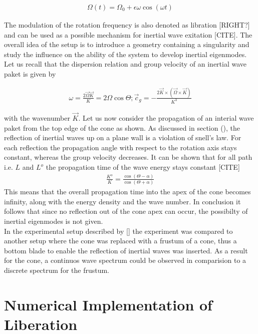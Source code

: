 \begin{align}
\Omega(t) = \Omega_0 + \epsilon \omega \cos(\omega t)
\end{align}

The modulation of the rotation frequency is also denoted as libration [RIGHT?] and can be used as a possible mechanism
for inertial wave exitation [CITE].
The overall idea of the setup is to introduce a geometry containing a singularity and study the influence on the ability of
the system to develop inertial eigenmodes.
Let us recall that the dispersion relation and group velocity of an inertial wave paket is given by

\begin{align}
    \omega = \frac{2\vec{\Omega}\vec{K}}{K} = 2 \Omega \cos\Theta ; \vec{c}_g = -\frac{2\vec{K}\times (\vec{\Omega} \times \vec{K})}{K^3}
\end{align}

with the wavenumber $\vec{K}$.
Let us now consider the propagation of an interial wave paket from the top edge of the cone as shown.
As discussed in section (), the reflection of inertial waves up on a  plane wall is a violation of snell's law.
For each reflection the propagation angle with respect to the rotation axis stays constant,
whereas the group velocity decreases.
It can be shown that for all path i.e. $L$ and $L^o$ the propagation time of the wave energy stays constant [CITE]
\begin{align}
    \frac{K^o}{K} = \frac{\cos(\Theta - \alpha)}{\cos(\Theta + \alpha)}
\end{align}
This means that the overall propagation time into the apex of the cone becomes infinity, along with the energy density and the wave number.
In conclusion it follows that since no reflection out of the cone apex can occur, the possibilty of inertial eigenmodes is not given.\\
In the experimental setup described by [] the experiment was compared to another setup where the cone was replaced with a frustum of a cone,
thus a bottom blade to enable the reflection of inertial waves was inserted.
As a result for the cone, a continuos wave spectrum could be observed in comparision to a discrete spectrum  for the frustum.\\

\newpage

\section{Numerical Implementation of Liberation}

